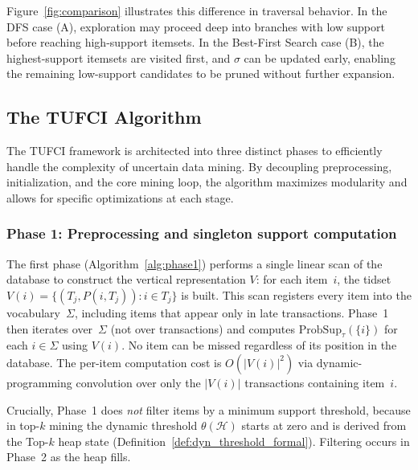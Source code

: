 \documentclass[10pt,letterpaper]{article}
\begin{document}
Figure~\ref{fig:comparison} illustrates this difference in traversal behavior. In the DFS case (A), exploration may proceed deep into branches with low support before reaching high-support itemsets. In the Best-First Search case (B), the highest-support itemsets are visited first, and \(\sigma\) can be updated early, enabling the remaining low-support candidates to be pruned without further expansion.



\subsection*{The TUFCI Algorithm}

The TUFCI framework is architected into three distinct phases to efficiently handle the complexity of uncertain data mining. By decoupling preprocessing, initialization, and the core mining loop, the algorithm maximizes modularity and allows for specific optimizations at each stage.


\subsubsection*{Phase 1: Preprocessing and singleton support computation}

The first phase (Algorithm~\ref{alg:phase1}) performs a single linear scan of the database to construct the vertical representation $V$: for each item~$i$, the tidset $V(i) = \{(T_j, P(i, T_j)) : i \in T_j\}$ is built. This scan registers every item into the vocabulary~$\Sigma$, including items that appear only in late transactions. Phase~1 then iterates over~$\Sigma$ (not over transactions) and computes $\mathrm{ProbSup}_{\tau}(\{i\})$ for each $i \in \Sigma$ using $V(i)$. No item can be missed regardless of its position in the database. The per-item computation cost is $O(|V(i)|^2)$ via dynamic-programming convolution over only the $|V(i)|$ transactions containing item~$i$.

Crucially, Phase~1 does \emph{not} filter items by a minimum support threshold, because in top-$k$ mining the dynamic threshold $\theta(\mathcal{H})$ starts at zero and is derived from the Top-$k$ heap state (Definition~\ref{def:dyn_threshold_formal}). Filtering occurs in Phase~2 as the heap fills.
\end{document}
